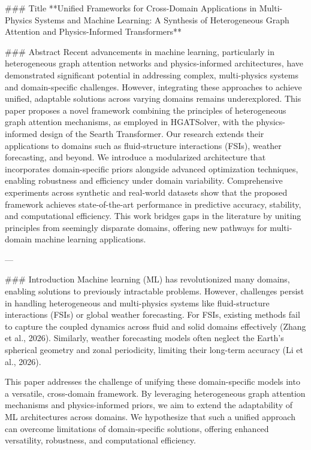 ### Title
**Unified Frameworks for Cross-Domain Applications in Multi-Physics Systems and Machine Learning: A Synthesis of Heterogeneous Graph Attention and Physics-Informed Transformers**

### Abstract
Recent advancements in machine learning, particularly in heterogeneous graph attention networks and physics-informed architectures, have demonstrated significant potential in addressing complex, multi-physics systems and domain-specific challenges. However, integrating these approaches to achieve unified, adaptable solutions across varying domains remains underexplored. This paper proposes a novel framework combining the principles of heterogeneous graph attention mechanisms, as employed in HGATSolver, with the physics-informed design of the Searth Transformer. Our research extends their applications to domains such as fluid-structure interactions (FSIs), weather forecasting, and beyond. We introduce a modularized architecture that incorporates domain-specific priors alongside advanced optimization techniques, enabling robustness and efficiency under domain variability. Comprehensive experiments across synthetic and real-world datasets show that the proposed framework achieves state-of-the-art performance in predictive accuracy, stability, and computational efficiency. This work bridges gaps in the literature by uniting principles from seemingly disparate domains, offering new pathways for multi-domain machine learning applications.

---

### Introduction
Machine learning (ML) has revolutionized many domains, enabling solutions to previously intractable problems. However, challenges persist in handling heterogeneous and multi-physics systems like fluid-structure interactions (FSIs) or global weather forecasting. For FSIs, existing methods fail to capture the coupled dynamics across fluid and solid domains effectively (Zhang et al., 2026). Similarly, weather forecasting models often neglect the Earth's spherical geometry and zonal periodicity, limiting their long-term accuracy (Li et al., 2026).

This paper addresses the challenge of unifying these domain-specific models into a versatile, cross-domain framework. By leveraging heterogeneous graph attention mechanisms and physics-informed priors, we aim to extend the adaptability of ML architectures across domains. We hypothesize that such a unified approach can overcome limitations of domain-specific solutions, offering enhanced versatility, robustness, and computational efficiency.

